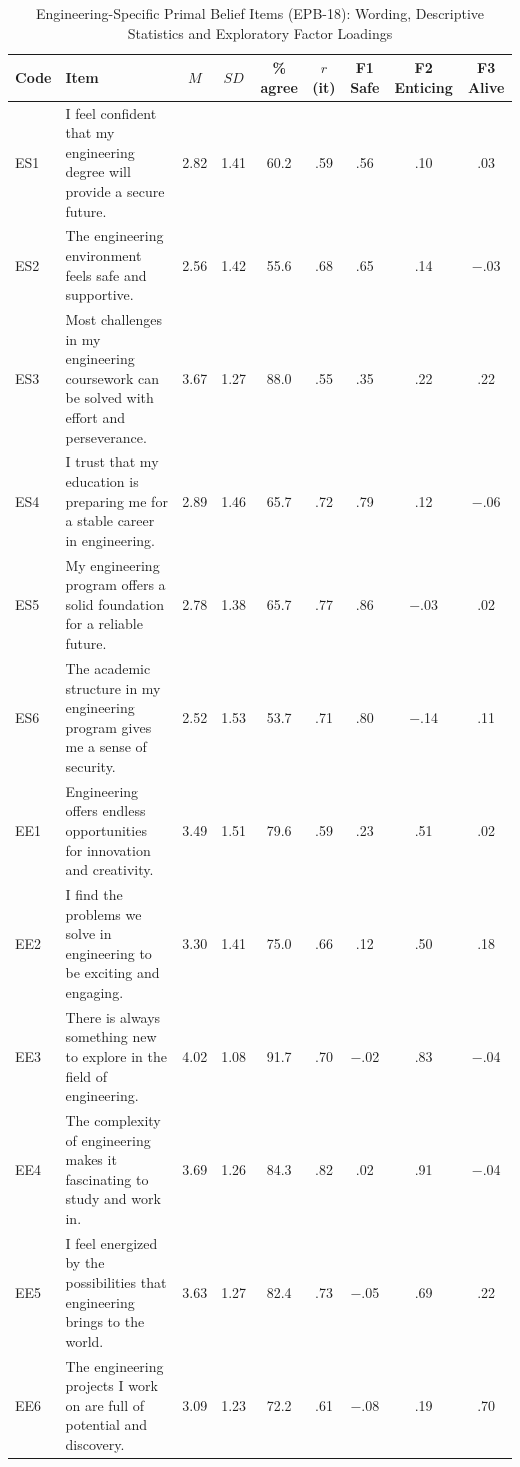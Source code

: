 \documentclass[journal,a4paper]{IEEEtran}
\begin{document}
\begin{table}[!htbp]
\centering
\renewcommand{\arraystretch}{1.15}
\footnotesize
\setlength{\tabcolsep}{3pt}
\caption{Engineering-Specific Primal Belief Items (EPB-18): Wording, Descriptive Statistics and Exploratory Factor Loadings}
\label{tab:s1}
\begin{tabular}{>{\raggedright\arraybackslash}p{0.75cm}>{\raggedright\arraybackslash}p{7.2cm}ccccccc}
\toprule
Code & Item & $M$ & $SD$ & \% agree & $r$(it) & F1 Safe & F2 Enticing & F3 Alive \\
\midrule
ES1 & I feel confident that my engineering degree will provide a secure future. & 2.82 & 1.41 & 60.2 & .59 & .56 & .10 & .03 \\
ES2 & The engineering environment feels safe and supportive. & 2.56 & 1.42 & 55.6 & .68 & .65 & .14 & $-$.03 \\
ES3 & Most challenges in my engineering coursework can be solved with effort and perseverance. & 3.67 & 1.27 & 88.0 & .55 & .35 & .22 & .22 \\
ES4 & I trust that my education is preparing me for a stable career in engineering. & 2.89 & 1.46 & 65.7 & .72 & .79 & .12 & $-$.06 \\
ES5 & My engineering program offers a solid foundation for a reliable future. & 2.78 & 1.38 & 65.7 & .77 & .86 & $-$.03 & .02 \\
ES6 & The academic structure in my engineering program gives me a sense of security. & 2.52 & 1.53 & 53.7 & .71 & .80 & $-$.14 & .11 \\
EE1 & Engineering offers endless opportunities for innovation and creativity. & 3.49 & 1.51 & 79.6 & .59 & .23 & .51 & .02 \\
EE2 & I find the problems we solve in engineering to be exciting and engaging. & 3.30 & 1.41 & 75.0 & .66 & .12 & .50 & .18 \\
EE3 & There is always something new to explore in the field of engineering. & 4.02 & 1.08 & 91.7 & .70 & $-$.02 & .83 & $-$.04 \\
EE4 & The complexity of engineering makes it fascinating to study and work in. & 3.69 & 1.26 & 84.3 & .82 & .02 & .91 & $-$.04 \\
EE5 & I feel energized by the possibilities that engineering brings to the world. & 3.63 & 1.27 & 82.4 & .73 & $-$.05 & .69 & .22 \\
EE6 & The engineering projects I work on are full of potential and discovery. & 3.09 & 1.23 & 72.2 & .61 & $-$.08 & .19 & .70 \\

\end{tabular}
\end{table}
\end{document}

